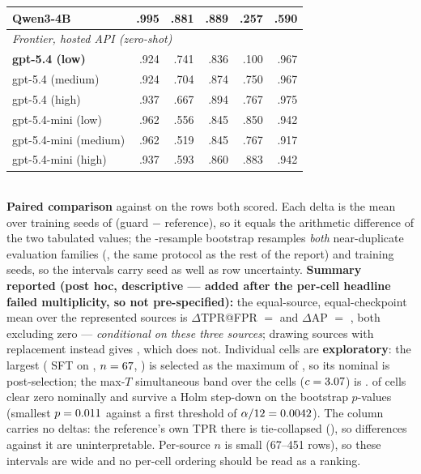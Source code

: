 \begin{table}[htbp]
\begin{tabular}{lrrrrr}
Qwen3-4B & .995 & .881 & .889 & .257 & .590 \\
\midrule
\multicolumn{6}{l}{\emph{Frontier, hosted API (zero-shot)}} \\
\textbf{gpt-5.4 (low)} & .924 & .741 & .836 & \textdagger{}.100 & .967 \\
gpt-5.4 (medium) & .924 & .704 & .874 & .750 & .967 \\
gpt-5.4 (high) & .937 & .667 & .894 & .767 & .975 \\
gpt-5.4-mini (low) & .962 & .556 & .845 & .850 & .942 \\
gpt-5.4-mini (medium) & .962 & .519 & .845 & .767 & .917 \\
gpt-5.4-mini (high) & .937 & .593 & .860 & .883 & .942 \\
\bottomrule
\end{tabular}\\[3pt]{\footnotesize \textbf{Paired comparison} against \HtwoRef{} on the rows both scored. Each delta is the mean over training seeds of (guard $-$ reference), so it equals the arithmetic difference of the two tabulated values; the \HtwoNBoot{}-resample bootstrap resamples \emph{both} near-duplicate evaluation families (, the same protocol as the rest of the report) and training seeds, so the intervals carry seed as well as row uncertainty. \textbf{Summary reported (post hoc, descriptive --- added after the per-cell headline failed multiplicity, so not pre-specified):} the equal-source, equal-checkpoint mean over the \HtwoNRepSources{} represented sources is $\Delta$TPR@\HtwoBudget{}FPR $=$ \HtwoAggDeltaTpr{} \HtwoAggDeltaTprCI{} and $\Delta$AP $=$ \HtwoAggDeltaAp{} \HtwoAggDeltaApCI{}, both excluding zero --- \emph{conditional on these three sources}; drawing sources with replacement instead gives \HtwoAggSrcResampledCI{}, which does not. Individual cells are \textbf{exploratory}: the largest (\HtwoBestName{} SFT on \HtwoBestSource{}, $n=67$, \HtwoBestDeltaTpr{}) is selected as the maximum of \HtwoNCells{}, so its nominal \HtwoBestDeltaTprCI{} is post-selection; the max-$T$ simultaneous band over the \HtwoNCells{} cells ($c=3.07$) is \HtwoBestDeltaTprHolm{}. \HtwoNSigNominal{} of \HtwoNCells{} cells clear zero nominally and \HtwoNSigHolm{} survive a Holm step-down on the bootstrap $p$-values (smallest $p=0.011$ against a first threshold of $\alpha/12=0.0042$). The  column carries no deltas: the reference's own TPR there is tie-collapsed (\textdagger), so differences against it are uninterpretable. Per-source $n$ is small (67--451 rows), so these intervals are wide and no per-cell ordering should be read as a ranking.}
\end{table}
